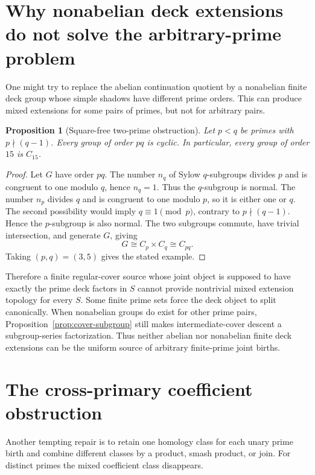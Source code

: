 \documentclass[11pt]{article}
\newtheorem{proposition}[theorem]{Proposition}
\begin{document}
\section{Why nonabelian deck extensions do not solve the arbitrary-prime problem}

One might try to replace the abelian continuation quotient by a nonabelian
finite deck group whose simple shadows have different prime orders.  This can
produce mixed extensions for some pairs of primes, but not for arbitrary
pairs.

\begin{proposition}[Square-free two-prime obstruction]
\label{prop:pq-obstruction}
Let \(p<q\) be primes with \(p\nmid(q-1)\).  Every group of order \(pq\) is
cyclic.  In particular, every group of order \(15\) is \(C_{15}\).
\end{proposition}

\begin{proof}
Let \(G\) have order \(pq\).  The number \(n_q\) of Sylow \(q\)-subgroups
divides \(p\) and is congruent to one modulo \(q\), hence \(n_q=1\).  Thus the
\(q\)-subgroup is normal.  The number \(n_p\) divides \(q\) and is congruent
to one modulo \(p\), so it is either one or \(q\).  The second possibility
would imply \(q\equiv1\pmod p\), contrary to \(p\nmid(q-1)\).  Hence the
\(p\)-subgroup is also normal.  The two subgroups commute, have trivial
intersection, and generate \(G\), giving
\[
G\cong C_p\times C_q\cong C_{pq}.
\]
Taking \((p,q)=(3,5)\) gives the stated example.
\end{proof}

Therefore a finite regular-cover source whose joint object is supposed to
have exactly the prime deck factors in \(S\) cannot provide nontrivial mixed
extension topology for every \(S\).  Some finite prime sets force the deck
object to split canonically.  When nonabelian groups do exist for other prime
pairs, Proposition~\ref{prop:cover-subgroup} still makes intermediate-cover
descent a subgroup-series factorization.  Thus neither abelian nor nonabelian
finite deck extensions can be the uniform source of arbitrary finite-prime
joint births.

\section{The cross-primary coefficient obstruction}

Another tempting repair is to retain one homology class for each unary prime
birth and combine different classes by a product, smash product, or join.  For
distinct primes the mixed coefficient class disappears.
\end{document}
